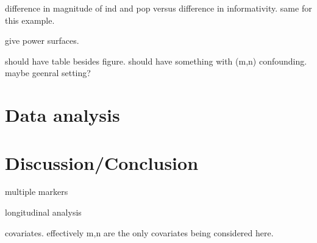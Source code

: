 \message{ !name(manuscript.tex)}\documentclass[12pt]{article}
\begin{document}
difference in magnitude of ind and pop versus difference in
informativity. same for this example.

give power surfaces.

should have table besides figure.
should have something with (m,n) confounding. maybe geenral setting?

\section{Data analysis}

\section{Discussion/Conclusion}
multiple markers

longitudinal analysis

covariates. effectively m,n are the only covariates being considered here.



\end{document}
